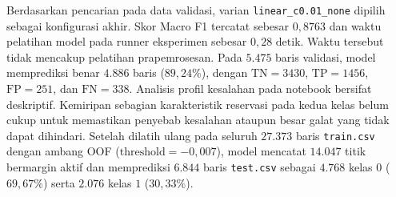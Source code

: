\begin{table}[H]
    \centering
    \caption{Rincian metrik per kelas untuk konfigurasi terbaik tiap kernel \texttt{SVMFromScratch} pada data validasi.}
    \label{tab:svm_best_kernels}
\end{table}

Berdasarkan pencarian pada data validasi, varian \texttt{linear\_c0.01\_none} dipilih sebagai konfigurasi akhir. Skor Macro F1 tercatat sebesar $0{,}8763$ dan waktu pelatihan model pada runner eksperimen sebesar $0{,}28\text{ detik}$. Waktu tersebut tidak mencakup pelatihan prapemrosesan. Pada $5.475$ baris validasi, model memprediksi benar $4.886$ baris ($89{,}24\%$), dengan $\text{TN}=3430$, $\text{TP}=1456$, $\text{FP}=251$, dan $\text{FN}=338$. Analisis profil kesalahan pada notebook bersifat deskriptif. Kemiripan sebagian karakteristik reservasi pada kedua kelas belum cukup untuk memastikan penyebab kesalahan ataupun besar galat yang tidak dapat dihindari. Setelah dilatih ulang pada seluruh $27.373$ baris \texttt{train.csv} dengan ambang OOF ($\text{threshold}=-0{,}007$), model mencatat $14.047$ titik bermargin aktif dan memprediksi $6.844$ baris \texttt{test.csv} sebagai $4.768$ kelas $0$ ($69{,}67\%$) serta $2.076$ kelas $1$ ($30{,}33\%$).

